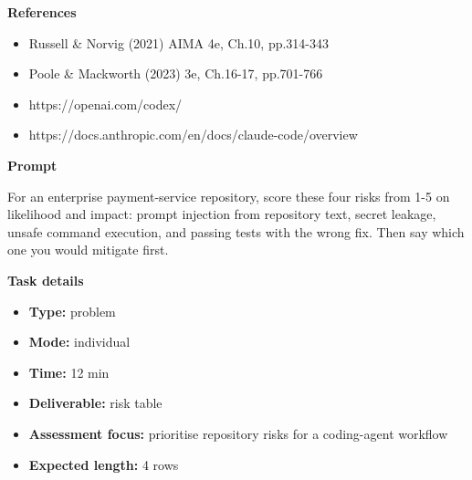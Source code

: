 \documentclass[11pt]{article}
\begin{document}
\begin{tcolorbox}[colback=white,colframe=MidnightBlue,title={Q2 Structured Problem},fonttitle=\bfseries,breakable]
{\large\bfseries\color{MidnightBlue} References}\par\medskip
\begin{itemize}\item Russell \& Norvig (2021) AIMA 4e, Ch.10, pp.314-343
\item Poole \& Mackworth (2023) 3e, Ch.16-17, pp.701-766
\item https://openai.com/codex/
\item https://docs.anthropic.com/en/docs/claude-code/overview\end{itemize}
\end{tcolorbox}

\begin{tcolorbox}[colback=white,colframe=MidnightBlue,title={Q3 Structured Problem},fonttitle=\bfseries,breakable]
\begin{center}
\end{center}

{\large\bfseries\color{MidnightBlue} Prompt}\par\medskip
For an enterprise payment-service repository, score these four risks from 1-5 on likelihood and impact: prompt injection from repository text, secret leakage, unsafe command execution, and passing tests with the wrong fix. Then say which one you would mitigate first.

{\large\bfseries\color{MidnightBlue} Task details}\par\medskip
\begin{itemize}\item \textbf{Type:} problem
\item \textbf{Mode:} individual
\item \textbf{Time:} 12 min
\item \textbf{Deliverable:} risk table
\item \textbf{Assessment focus:} prioritise repository risks for a coding-agent workflow
\item \textbf{Expected length:} 4 rows\end{itemize}


\end{tcolorbox}
\end{document}
